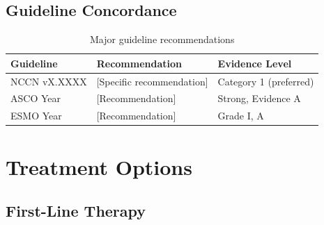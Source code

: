 \documentclass[10pt,letterpaper]{article}
\begin{document}
\subsection{Guideline Concordance}

\begin{table}[H]
\centering
\small
\begin{tabular}{lll}
\toprule
\textbf{Guideline} & \textbf{Recommendation} & \textbf{Evidence Level} \\
\midrule
NCCN vX.XXXX & [Specific recommendation] & Category 1 (preferred) \\
ASCO Year & [Recommendation] & Strong, Evidence A \\
ESMO Year & [Recommendation] & Grade I, A \\
\bottomrule
\end{tabular}
\caption{Major guideline recommendations}
\end{table}

\section{Treatment Options}

\subsection{First-Line Therapy}
\end{document}
